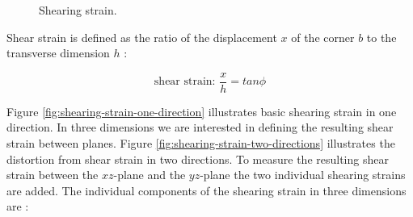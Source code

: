 \begin{figure}
  \centering
  \caption{Shearing strain.}
  \label{fig:shear-strain}
\end{figure}

Shear strain is defined as the ratio of the displacement $x$ of the corner
$b$ to the transverse dimension $h$ :

\begin{equation}
\mbox{shear strain: } \frac{x}{h} = tan \phi
\end{equation}

Figure \vref{fig:shearing-strain-one-direction} illustrates basic
shearing strain in one direction. In three dimensions we are
interested in defining the resulting shear strain between
planes. Figure \vref{fig:shearing-strain-two-directions} illustrates
the distortion from shear strain in two directions. To measure the
resulting shear strain between the $xz$-plane and the $yz$-plane the
two individual shearing strains are added.
%
The individual components of the shearing strain in three dimensions are
:

